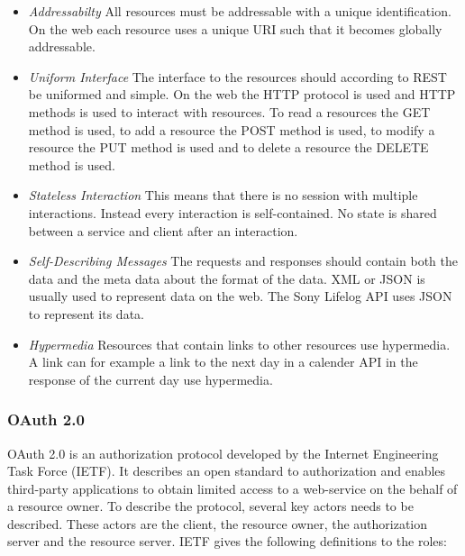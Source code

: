 \documentclass{cslthse-msc}
\begin{document}
\begin{itemize}
    \item \emph{Addressabilty} All resources must be addressable with a unique identification. On the web each resource uses a unique URI such that it becomes globally addressable.
    \item \emph{Uniform Interface} The interface to the resources should according to REST be uniformed and simple. On the web the HTTP protocol is used and HTTP methods is used to interact with resources. To read a resources the GET method is used, to add a resource the POST method is used, to modify a resource the PUT method is used and to delete a resource the DELETE method is used.
    \item \emph{Stateless Interaction} This means that there is no session with multiple interactions. Instead every interaction is self-contained. No state is shared between a service and client after an interaction.
    \item \emph{Self-Describing Messages} The requests and responses should contain both the data and the meta data about the format of the data. XML or JSON is usually used to represent data on the web. The Sony Lifelog API uses JSON to represent its data.

\item \emph{Hypermedia} Resources that contain links to other resources use hypermedia. A link can for example a link to the next day in a calender API in the response of the current day use hypermedia. 

\end{itemize}

\subsubsection{OAuth 2.0}

OAuth 2.0 is an authorization protocol developed by the Internet Engineering Task Force (IETF). It describes an open standard to authorization and enables third-party applications to obtain limited access to a web-service on the behalf of a resource owner\cite{oauth2spec}. To describe the protocol, several key actors needs to be described. These actors are the client, the resource owner, the authorization server and the resource server. IETF gives the following definitions to the roles: 
\end{document}
